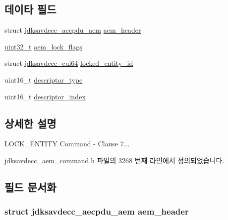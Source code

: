 \subsection*{데이타 필드}
\begin{DoxyCompactItemize}
\item 
struct \hyperlink{structjdksavdecc__aecpdu__aem}{jdksavdecc\+\_\+aecpdu\+\_\+aem} \hyperlink{structjdksavdecc__aem__command__lock__entity_ae1e77ccb75ff5021ad923221eab38294}{aem\+\_\+header}
\item 
\hyperlink{parse_8c_a6eb1e68cc391dd753bc8ce896dbb8315}{uint32\+\_\+t} \hyperlink{structjdksavdecc__aem__command__lock__entity_a6203f9642ca069acf13bc5f085acc9d0}{aem\+\_\+lock\+\_\+flags}
\item 
struct \hyperlink{structjdksavdecc__eui64}{jdksavdecc\+\_\+eui64} \hyperlink{structjdksavdecc__aem__command__lock__entity_a397afd1623d57ce0b39e414e537ee497}{locked\+\_\+entity\+\_\+id}
\item 
uint16\+\_\+t \hyperlink{structjdksavdecc__aem__command__lock__entity_ab7c32b6c7131c13d4ea3b7ee2f09b78d}{descriptor\+\_\+type}
\item 
uint16\+\_\+t \hyperlink{structjdksavdecc__aem__command__lock__entity_a042bbc76d835b82d27c1932431ee38d4}{descriptor\+\_\+index}
\end{DoxyCompactItemize}


\subsection{상세한 설명}
L\+O\+C\+K\+\_\+\+E\+N\+T\+I\+TY Command -\/ Clause 7... 

jdksavdecc\+\_\+aem\+\_\+command.\+h 파일의 3268 번째 라인에서 정의되었습니다.



\subsection{필드 문서화}
\subsubsection[{\texorpdfstring{aem\+\_\+header}{aem_header}}]{\setlength{\rightskip}{0pt plus 5cm}struct {\bf jdksavdecc\+\_\+aecpdu\+\_\+aem} aem\+\_\+header}\hypertarget{structjdksavdecc__aem__command__lock__entity_ae1e77ccb75ff5021ad923221eab38294}{}\label{structjdksavdecc__aem__command__lock__entity_ae1e77ccb75ff5021ad923221eab38294}


